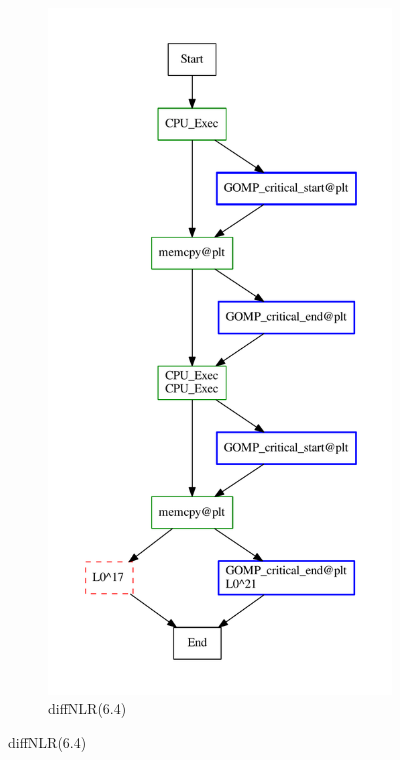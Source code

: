 \begin{figure}
     \centering
     \begin{subfigure}[b]{0.31\textwidth}
        \centering
\includegraphics[width=\textwidth]{figs/diffNLR/ompBug-6-4-x0.pdf}
\caption{diffNLR(6.4)}

\end{subfigure}
\end{figure}
